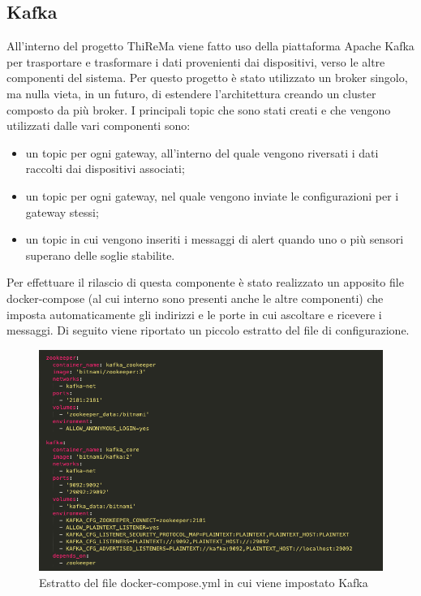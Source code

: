 \subsection{Kafka}
	All'interno del progetto ThiReMa viene fatto uso della piattaforma Apache Kafka per trasportare e trasformare i dati provenienti dai dispositivi, verso le altre componenti del sistema.
	\newline
	Per questo progetto è stato utilizzato un broker singolo, ma nulla vieta, in un futuro, di estendere l'architettura creando un cluster composto da più broker.
	\newline
	\newline
	I principali topic che sono stati creati e che vengono utilizzati dalle vari componenti sono:
	\begin{itemize}
		\item un topic per ogni gateway, all'interno del quale vengono riversati i dati raccolti dai dispositivi associati;
		\item un topic per ogni gateway, nel quale vengono inviate le configurazioni per i gateway stessi;
		\item un topic in cui vengono inseriti i messaggi di alert quando uno o più sensori superano delle 
		soglie stabilite.
	\end{itemize}
	Per effettuare il rilascio di questa componente è stato realizzato un apposito file docker-compose (al cui interno sono presenti anche le altre componenti) che imposta automaticamente gli indirizzi e le porte in cui ascoltare e ricevere i messaggi.
	\newline
	Di seguito viene riportato un piccolo estratto del file di configurazione.

	\begin{figure}[H]
			\centering
			\includegraphics[scale=0.470]{res/images/estrattoKafka_dockerCompose.png}
			\caption{Estratto del file docker-compose.yml in cui viene impostato Kafka}
			\label{Immagine 1}
		\end{figure}		